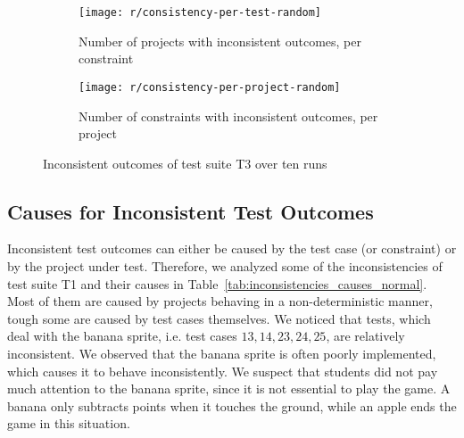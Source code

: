\begin{figure}[htpb]
    \centering
    \begin{subfigure}{.75\textwidth}
        \texttt{[image: r/consistency-per-test-random]}%
        \vspace{-\medskipamount}
        \caption{Number of projects with inconsistent outcomes, per constraint}
        \label{fig:consistency_per_test_random}
    \end{subfigure}

    \bigskip

    \begin{subfigure}{.75\textwidth}
        \texttt{[image: r/consistency-per-project-random]}%
        \vspace{-\medskipamount}
        \caption{Number of constraints with inconsistent outcomes, per project}
        \label{fig:consistency_per_project_random}
    \end{subfigure}

    \caption{Inconsistent outcomes of test suite T3 over ten runs}
    \label{fig:consistency_random}
\end{figure}

\subsection{Causes for Inconsistent Test Outcomes}

Inconsistent test outcomes can either be caused by the test case (or constraint) or by the project under test.
Therefore, we analyzed some of the inconsistencies of test suite T1 and their causes in Table~\ref{tab:inconsistencies_causes_normal}.
Most of them are caused by projects behaving in a non-deterministic manner,
tough some are caused by test cases themselves.
We noticed that tests, which deal with the banana sprite, i.e. test cases $13, 14, 23, 24, 25$, are relatively inconsistent.
We observed that the banana sprite is often poorly implemented, which causes it to behave inconsistently.
We suspect that students did not pay much attention to the banana sprite, since it is not essential to play the game.
A banana only subtracts points when it touches the ground, while an apple ends the game in this situation.
\parspace


